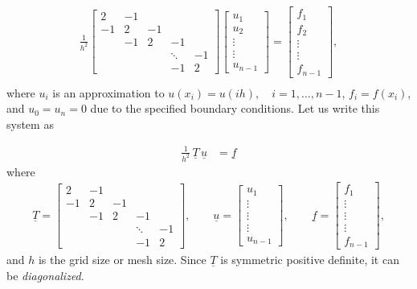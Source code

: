 \documentclass[11pt]{article}
\begin{document}
\begin{align*}
  \frac{1}{h^2}
  \begin{bmatrix}
    2 & -1 & & & \\
    -1 & 2 & -1 & & \\
    & -1 & 2 & -1 & \\
    & & & \ddots & -1 \\
    & & & -1 & 2
  \end{bmatrix}
  \begin{bmatrix}
    u_1 \\
    u_2 \\
    \vdots \\
    \vdots \\
    u_{n-1}
  \end{bmatrix}
  =
  \begin{bmatrix}
    f_1 \\
    f_2 \\
    \vdots \\
    \vdots \\
    f_{n-1} 
  \end{bmatrix}, \\ 
\end{align*}
where $u_i$ is an approximation to $u(x_i) = u(ih), \quad i=1,\ldots,n-1$, 
$f_i=f(x_i)$, and $u_0 = u_n=0$ due to the specified boundary conditions. 
Let us write this system as

\begin{align*}
  \frac{1}{h^2}\, \underline{T} \, \underline{u} &= \underline{f} 
\end{align*}
where 
\begin{align*}
  \underline{T} = 
  \begin{bmatrix}
    2 & -1 & & & \\
    -1 & 2 & -1 & & \\
    & -1 & 2 & -1 & \\
    & & & \ddots & -1 \\
    & & & -1 & 2
  \end{bmatrix} , \qquad 
  \underline{u} =
  \begin{bmatrix}
    u_1 \\
    \vdots \\
    \vdots \\
    \vdots \\
    u_{n-1}
  \end{bmatrix} , \qquad
  \underline{f} =
  \begin{bmatrix}
    f_1 \\
    \vdots \\
    \vdots \\
    \vdots \\
    f_{n-1}
  \end{bmatrix} ,
\end{align*}
and $h$ is the grid size or mesh size. Since $\underline{T}$ is symmetric positive definite, it can be {\em diagonalized}.
\end{document}
